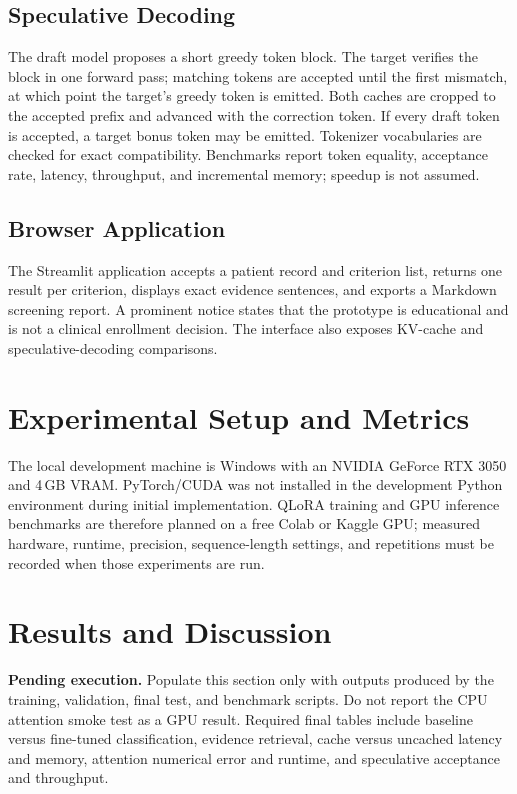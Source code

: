 \documentclass[conference]{IEEEtran}
\begin{document}
\subsection{Speculative Decoding}
The draft model proposes a short greedy token block. The target verifies the block in
one forward pass; matching tokens are accepted until the first mismatch, at which
point the target's greedy token is emitted. Both caches are cropped to the accepted
prefix and advanced with the correction token. If every draft token is accepted, a
target bonus token may be emitted. Tokenizer vocabularies are checked for exact
compatibility. Benchmarks report token equality, acceptance rate, latency, throughput,
and incremental memory; speedup is not assumed.

\subsection{Browser Application}
The Streamlit application accepts a patient record and criterion list, returns one
result per criterion, displays exact evidence sentences, and exports a Markdown
screening report. A prominent notice states that the prototype is educational and is
not a clinical enrollment decision. The interface also exposes KV-cache and
speculative-decoding comparisons.

\section{Experimental Setup and Metrics}
The local development machine is Windows with an NVIDIA GeForce RTX 3050 and 4\,GB
VRAM. PyTorch/CUDA was not installed in the development Python environment during
initial implementation. QLoRA training and GPU inference benchmarks are therefore
planned on a free Colab or Kaggle GPU; measured hardware, runtime, precision,
sequence-length settings, and repetitions must be recorded when those experiments
are run.

\section{Results and Discussion}
\textbf{Pending execution.} Populate this section only with outputs produced by the
training, validation, final test, and benchmark scripts. Do not report the CPU
attention smoke test as a GPU result. Required final tables include baseline versus
fine-tuned classification, evidence retrieval, cache versus uncached latency and
memory, attention numerical error and runtime, and speculative acceptance and
throughput.
\end{document}
